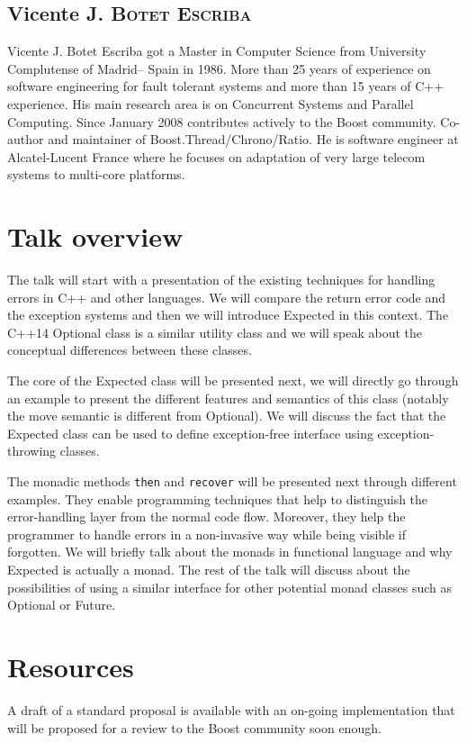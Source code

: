 \documentclass[a4paper,10pt]{article}
\begin{document}
\subsection{Vicente J. B\textsc{otet} E\textsc{scriba}}

Vicente J. Botet Escriba got a Master in Computer Science from University Complutense of Madrid– Spain in 1986. More than 25 years of experience on software engineering for fault tolerant systems and more than 15 years of C++ experience. His main research area is on Concurrent Systems and Parallel Computing. Since January 2008 contributes actively to the Boost community. Co-author and maintainer of Boost.Thread/Chrono/Ratio. He is software engineer at Alcatel-Lucent France where he focuses on adaptation of very large telecom systems to multi-core platforms.

\section{Talk overview}

The talk will start with a presentation of the existing techniques for handling errors in C++ and other languages. We will compare the return error code and the exception systems and then we will introduce Expected in this context. The C++14 Optional class is a similar utility class and we will speak about the conceptual differences between these classes.
\newline

The core of the Expected class will be presented next, we will directly go through an example to present the different features and semantics of this class (notably the move semantic is different from Optional). We will discuss the fact that the Expected class can be used to define exception-free interface using exception-throwing classes.
\newline

The monadic methods \lstinline{then} and \lstinline{recover} will be presented next through different examples. They enable programming techniques that help to distinguish the error-handling layer from the normal code flow. Moreover, they help the programmer to handle errors in a non-invasive way while being visible if forgotten. We will briefly talk about the monads in functional language and why Expected is actually a monad. The rest of the talk will discuss about the possibilities of using a similar interface for other potential monad classes such as Optional or Future.

\section{Resources}

A draft of a standard proposal is available\cite{std.expected} with an on-going implementation\cite{boost.expected} that will be proposed for a review to the Boost community soon enough.

\newpage


\end{document}
